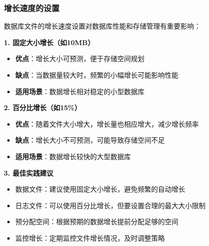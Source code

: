 \subsubsection{增长速度的设置}

\qquad 数据库文件的增长速度设置对数据库性能和存储管理有重要影响：

\textbf{1. 固定大小增长（如10MB）}
\begin{itemize}
  \item \textbf{优点}：增长大小可预测，便于存储空间规划
  \item \textbf{缺点}：当数据量较大时，频繁的小幅增长可能影响性能
  \item \textbf{适用场景}：数据增长相对稳定的小型数据库
\end{itemize}

\textbf{2. 百分比增长（如15\%）}
\begin{itemize}
  \item \textbf{优点}：随着文件大小增大，增长量也相应增大，减少增长频率
  \item \textbf{缺点}：增长大小不可预测，可能导致存储空间不足
  \item \textbf{适用场景}：数据增长较快的大型数据库
\end{itemize}

\textbf{3. 最佳实践建议}
\begin{itemize}
  \item 数据文件：建议使用固定大小增长，避免频繁的自动增长
  \item 日志文件：可以使用百分比增长，但要设置合理的最大大小限制
  \item 预分配空间：根据预期的数据增长提前分配足够的空间
  \item 监控增长：定期监控文件增长情况，及时调整策略
\end{itemize}